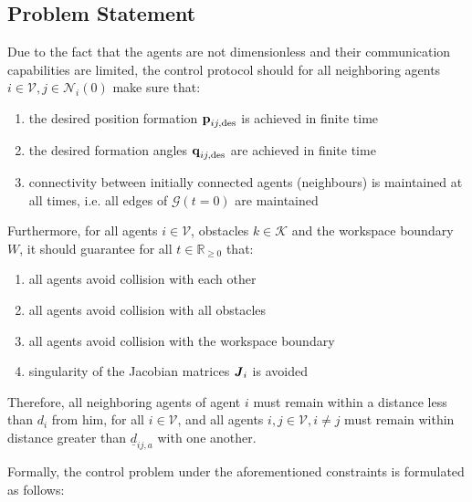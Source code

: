 \subsection{Problem Statement}
Due to the fact that the agents are not dimensionless and their communication
capabilities are limited, the control protocol should for all neighboring
agents $i \in \mathcal{V}, j \in \mathcal{N}_i(0)$ make sure that:

\begin{enumerate}
  \item the desired position formation $\bm{\mathbf{p}}_{ij, \text{des}}$ is achieved
    in finite time
  \item the desired formation angles $\bm{\mathbf{q}}_{ij, \text{des}}$ are achieved
    in finite time
  \item connectivity between initially connected agents (neighbours) is
    maintained at all times, i.e. all edges of $\mathcal{G}(t=0)$ are maintained
\end{enumerate}
Furthermore, for all agents $i \in \mathcal{V}$, obstacles $k \in \mathcal{K}$
and the workspace boundary $W$, it should guarantee for all
$t\in\mathbb{R}_{\geq 0}$ that:

\begin{enumerate}
  \item all agents avoid collision with each other
  \item all agents avoid collision with all obstacles
  \item all agents avoid collision with the workspace boundary
  \item singularity of the Jacobian matrices $\bm{\mathit{J}}_i$ is avoided
\end{enumerate}

Therefore, all neighboring agents of agent $i$ must remain within a distance
less than $d_i$ from him, for all $i \in \mathcal{V}$,
and all agents $i, j\in \mathcal{V}, i \neq j$ must remain within distance
greater than $\underline{d}_{ij,a}$ with one another.

Formally, the control problem under the aforementioned constraints is
formulated as follows:

